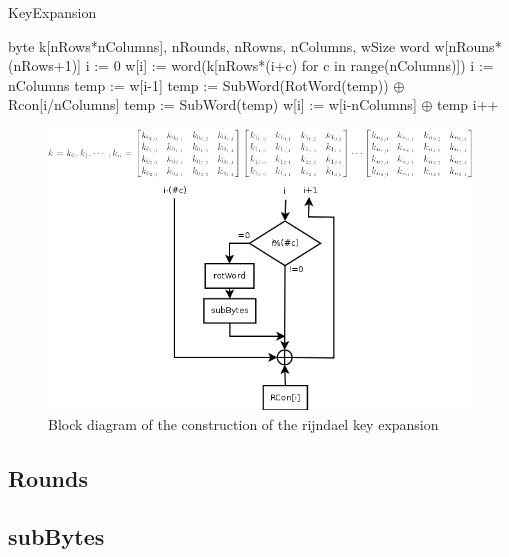 \documentclass[a4paper,twoside]{llncs}
\begin{document}
\begin{algorithm}
 \caption{KeyExpansion}
 \label{alg:keyExpansion}
 \begin{algorithmic}[1]
  \REQUIRE byte k[nRows*nColumns], nRounds, nRowns, nColumns, wSize
  \ENSURE word w[nRouns*(nRows+1)]
  \STATE i := 0
    \STATE w[i] := word(k[nRows*(i+c) for c in range(nColumns)])
  \ENDWHILE
  \STATE i := nColumns
    \STATE temp := w[i-1]
      \STATE temp := SubWord(RotWord(temp)) $\oplus$ Rcon[i/nColumns]
    \ELSE
      \STATE temp := SubWord(temp)
    \ENDIF
    \STATE w[i] := w[i-nColumns] $\oplus$ temp
    \STATE i++
  \ENDWHILE
 \end{algorithmic}
\end{algorithm}

\begin{figure}[b]
 \centering
 \includegraphics[scale=0.6,keepaspectratio=true]{./images/rijndael_keyExpansionDiagram.png}
 \caption{Block diagram of the construction of the rijndael key expansion}
\label{fig:keyExpansionDiagram}
\end{figure}


\subsection{Rounds}

\subsection{subBytes}
\end{document}
